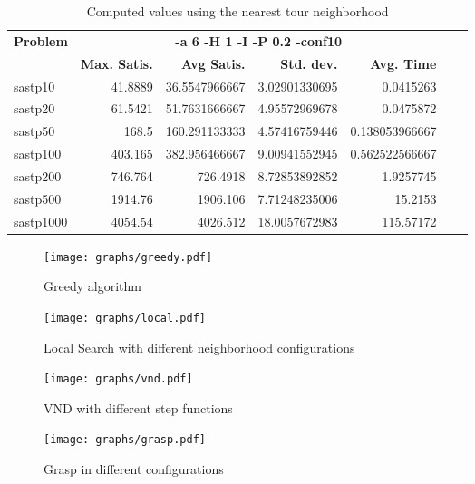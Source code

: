 \documentclass{article}
\begin{document}
\begin{table}[b!]
  \vspace{-6mm}%
  \caption{Computed values using the nearest tour neighborhood}
  \label{tab:NearestTour}
  \setlength{\tabcolsep}{1.4mm}
  \centering
  \begin{tabular}{lrrrrrr}
   \multirow{2}{*}{\bfseries Problem} &
      \multicolumn{4}{c}{\bfseries -a 6 -H 1 -I -P 0.2 -conf10 } \\
    &
    \bfseries Max. Satis. &
    \bfseries Avg Satis. &
    \bfseries Std. dev. &
    \bfseries Avg. Time 
    \\\hline
sastp10 & 41.8889 & 36.5547966667 & 3.02901330695 & 0.0415263 \\ 
sastp20 & 61.5421 & 51.7631666667 & 4.95572969678 & 0.0475872 \\ 
sastp50 & 168.5 & 160.291133333 & 4.57416759446 & 0.138053966667 \\ 
sastp100 & 403.165 & 382.956466667 & 9.00941552945 & 0.562522566667 \\ 
sastp200 & 746.764 & 726.4918 & 8.72853892852 & 1.9257745 \\ 
sastp500 & 1914.76 & 1906.106 & 7.71248235006 & 15.2153 \\ 
sastp1000 & 4054.54 & 4026.512 & 18.0057672983 & 115.57172
    \\\hline
  \end{tabular}

\end{table}






\begin{figure}[htb]
\centering
\texttt{[image: graphs/greedy.pdf]}
\caption{Greedy algorithm}
\label{fig:greedy}
\end{figure}

\begin{figure}[htb]
\centering
\texttt{[image: graphs/local.pdf]}
\caption{Local Search with different neighborhood configurations}
\label{fig:localSearch}
\end{figure}

\begin{figure}[htb]
\centering
\texttt{[image: graphs/vnd.pdf]}
\caption{VND with different step functions}
\label{fig:vnd}
\end{figure}

\begin{figure}[htb]
\centering
\texttt{[image: graphs/grasp.pdf]}
\caption{Grasp in different configurations}
\label{fig:grasp}
\end{figure}
\end{document}
